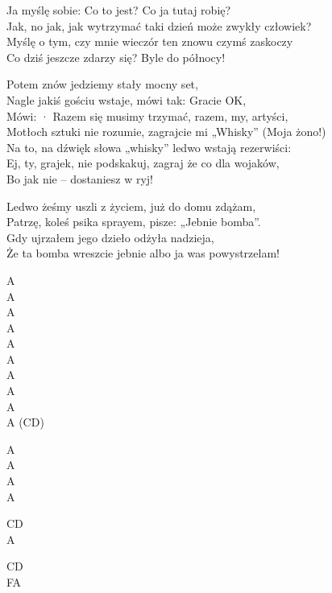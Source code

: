 \begin{text}
{Ja myślę sobie: Co to jest? Co ja tutaj robię?\\
Jak, no jak, jak wytrzymać taki dzień może zwykły człowiek?\\
Myślę o tym, czy mnie wieczór ten znowu czymś zaskoczy\\
Co dziś jeszcze zdarzy się? Byle do północy!

Potem znów jedziemy stały mocny set,\\
Nagle jakiś gościu wstaje, mówi tak: Gracie OK,\\
Mówi: · Razem się musimy trzymać, razem, my, artyści,\\
Motłoch sztuki nie rozumie, zagrajcie mi „Whisky” (Moja żono!)\\
Na to, na dźwięk słowa „whisky” ledwo wstają rezerwiści:\\
Ej, ty, grajek, nie podskakuj, zagraj że co dla wojaków,\\
Bo jak nie – dostaniesz w ryj!

Ledwo żeśmy uszli z życiem, już do domu zdążam,\\
Patrzę, koleś psika sprayem, pisze: „Jebnie bomba”.\\
Gdy ujrzałem jego dzieło odżyła nadzieja,\\
Że ta bomba wreszcie jebnie albo ja was powystrzelam!
}
\end{text}
\begin{chord}
    \small{
    A\\
    A\\
    A\\
    A\\
    A\\
    A\\
    A\\
    A\\
    A\\
    A (CD)

    A\\
    A\\
    A\\
    A

    CD\\
    A

    CD\\
    FA}
\end{chord}